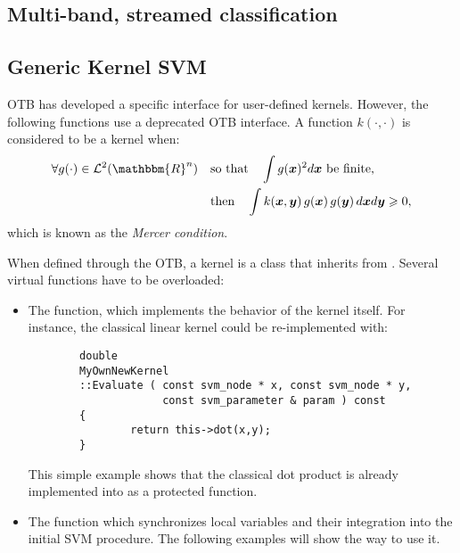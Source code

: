 %
%


\subsection{Multi-band, streamed classification}

\ifitkFullVersion

\fi




\subsection{Generic Kernel SVM}
OTB has developed a specific interface for user-defined kernels. However, the 
following functions use a deprecated OTB interface. A function 
$k(\cdot,\cdot)$ is considered to be a kernel when:
\begin{align}\label{eqMercer}
        \forall g(\cdot) \in {\cal L}^2(\mathbbm{R}^n) \quad & \text{so 
that} \quad
        \int g(\boldsymbol{x})^2 d\boldsymbol{x} \text{ be finite,} \\
        & \text{then} \quad \int k(\boldsymbol{x},\boldsymbol{y}) \, 
g(\boldsymbol{x})
        \, g(\boldsymbol{y}) \, d\boldsymbol{x} d\boldsymbol{y} \geqslant 0,
        \notag
\end{align}
which is known as the {\em Mercer condition\/}.

When defined through the OTB, a kernel is a class that inherits from
. Several virtual functions have to 
be overloaded:
\begin{itemize}
\item The  function, which implements the behavior of the 
kernel
itself. For instance, the classical linear kernel could be re-implemented
with:
\begin{verbatim}
        double
        MyOwnNewKernel
        ::Evaluate ( const svm_node * x, const svm_node * y,
                     const svm_parameter & param ) const
        {
                return this->dot(x,y);
        }
\end{verbatim}
This simple example shows that the classical dot product is already 
implemented
into  as a protected
function.
\item The  function which synchronizes local variables and 
their
integration into the initial SVM procedure. The following examples will show
the way to use it.
\end{itemize}


